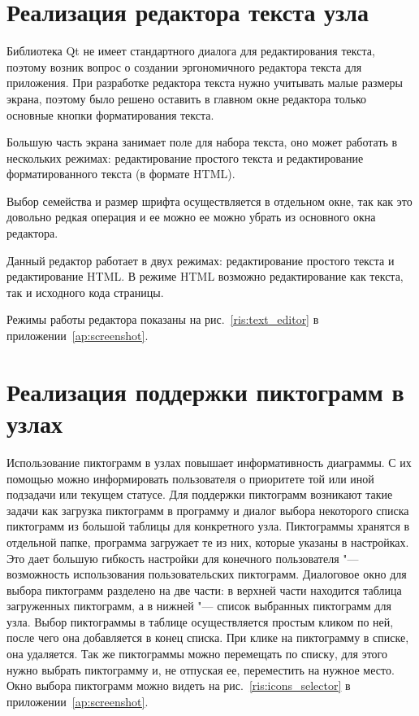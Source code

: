 \section{Реализация редактора текста узла}\label{sec:node_text_editor}

Библиотека Qt не имеет стандартного диалога для редактирования текста, поэтому возник вопрос о создании эргономичного редактора текста для приложения.
При разработке редактора текста нужно учитывать малые размеры экрана, поэтому было решено оставить в главном окне редактора только основные кнопки форматирования текста.

Большую часть экрана занимает поле для набора текста, оно может работать в нескольких режимах: редактирование простого текста и редактирование форматированного текста (в формате HTML).

Выбор семейства и размер шрифта осуществляется в отдельном окне, так как это довольно редкая операция и ее можно ее можно убрать из основного окна редактора.

Данный редактор работает в двух режимах: редактирование простого текста и редактирование HTML. В режиме HTML возможно редактирование как текста, так и исходного кода страницы. 

Режимы работы редактора показаны на рис.~\ref{ris:text_editor} в приложении~\ref{ap:screenshot}.

\section{Реализация поддержки пиктограмм в узлах}\label{sec:node_icons_support}

Использование пиктограмм в узлах повышает информативность диаграммы. С их помощью можно информировать пользователя о приоритете той или иной подзадачи или текущем статусе.
Для поддержки пиктограмм возникают такие задачи как загрузка пиктограмм в программу и диалог выбора некоторого списка пиктограмм из большой таблицы для конкретного узла.
Пиктограммы хранятся в отдельной папке, программа загружает те из них, которые указаны в настройках. Это дает большую гибкость настройки для конечного пользователя "--- возможность использования пользовательских пиктограмм.
Диалоговое окно для выбора пиктограмм разделено на две части: в верхней части находится таблица загруженных пиктограмм, а в нижней "--- список выбранных пиктограмм для узла. Выбор пиктограммы в таблице осуществляется простым кликом по ней, после чего она добавляется в конец списка.
При клике на пиктограмму в списке, она удаляется. Так же пиктограммы можно перемещать по списку, для этого нужно выбрать пиктограмму и, не отпуская ее, переместить на нужное место. Окно выбора пиктограмм можно видеть на рис.~\ref{ris:icons_selector} в приложении~\ref{ap:screenshot}.